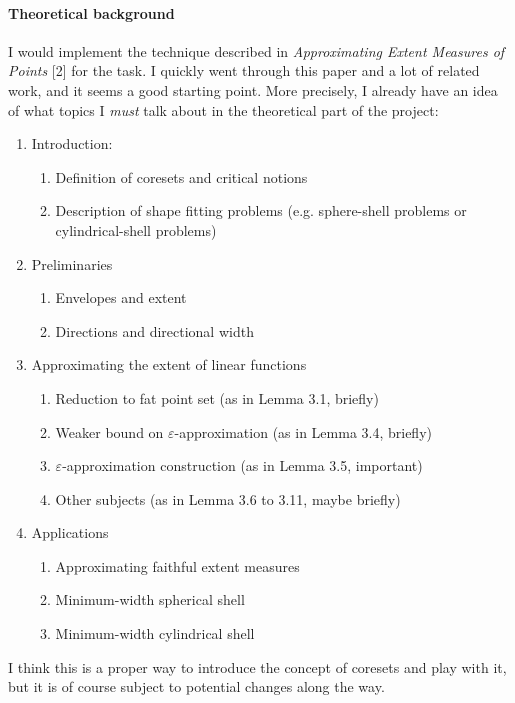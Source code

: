 \documentclass[a4paper,10pt]{article}
\begin{document}
\paragraph{Theoretical background} I would implement the technique described in \textit{Approximating Extent Measures of Points} [2] for the task. I quickly went through this paper and a lot of related work, and it seems a good starting point. More precisely, I already have an idea of what topics I \textit{must} talk about in the theoretical part of the project:
\begin{enumerate}
	\item Introduction: 
		\begin{enumerate}
			\item Definition of coresets and critical notions
			\item Description of shape fitting problems (e.g. sphere-shell problems or  cylindrical-shell problems)
		\end{enumerate}
	\item Preliminaries
		\begin{enumerate}
			\item Envelopes and extent
			\item Directions and directional width
		\end{enumerate}
	\item Approximating the extent of linear functions
		\begin{enumerate}
			\item Reduction to fat point set (as in Lemma 3.1, briefly)
			\item Weaker bound on $\varepsilon$-approximation (as in Lemma 3.4, briefly)
			\item $\varepsilon$-approximation construction (as in Lemma 3.5, important)
			\item Other subjects (as in Lemma 3.6 to 3.11, maybe briefly)
		\end{enumerate}
	\item Applications
		\begin{enumerate}
			\item Approximating faithful extent measures
			\item Minimum-width spherical shell
			\item Minimum-width cylindrical shell
		\end{enumerate}
\end{enumerate}  
I think this is a proper way to introduce the concept of coresets and play with it, but it is of course subject to potential changes along the way.
\end{document}
